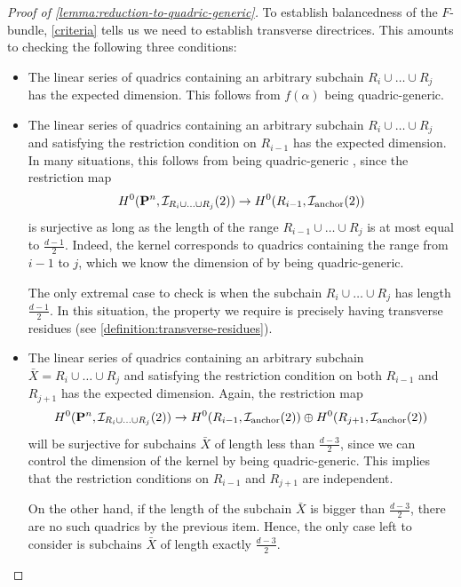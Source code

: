 \documentclass[11pt, two side, letterpaper, final]{amsart}
\renewcommand{\P}{{\bf P}}
\begin{document}
\begin{proof}[Proof of \cref{lemma:reduction-to-quadric-generic}]
To establish balancedness of the $F$-bundle, \cref{criteria} tells us we need to establish transverse directrices.
This amounts to checking the following three conditions:
\begin{itemize}
	\item The linear series of quadrics containing  an arbitrary subchain $R_i \cup \ldots \cup R_j$ has the expected dimension.
	This follows from $f(\alpha)$ being quadric-generic.
	\item The linear series of quadrics containing  an arbitrary subchain $R_i \cup \ldots \cup R_j$
	and satisfying the restriction condition on $R_{i-1}$ has the expected dimension.
	In many situations, this follows from being quadric-generic , since the restriction map
	\[
		H^0(\P^n, \sh{I}_{R_i \cup \ldots \cup R_j}(2)) \to 
		H^0(R_{i-1},\sh{I}_{\text{anchor}}(2))
	\]
	is surjective as long as the length of the range $R_{i-1} \cup \ldots \cup R_j$ is at most equal to $\frac{d-1}{2}$. Indeed, the kernel corresponds to quadrics
	containing the range from $i-1$ to $j$, which we know the dimension of by being quadric-generic.

	The only extremal case to check is when the subchain $R_i \cup \ldots \cup R_j$ has length
	$\frac{d-1}{2}$. In this situation, the property we require is precisely having transverse residues (see \cref{definition:transverse-residues}).

	\item The linear series of quadrics containing 
	an arbitrary subchain $\bar{X}=R_i \cup \ldots \cup R_j$ and satisfying the restriction condition
	on both $R_{i-1}$ and $R_{j+1}$ has the expected dimension. Again, the restriction map
	\[
		H^0(\P^n, \sh{I}_{R_i \cup \ldots \cup R_j}(2)) \to 
		H^0(R_{i-1},\sh{I}_{\text{anchor}}(2)) \oplus H^0(R_{j+1},\sh{I}_{\text{anchor}}(2))
	\]
	will be surjective for subchains $\bar{X}$ of length less than $\frac{d-3}{2}$, since we can control
	the dimension of the kernel by being quadric-generic. This implies that the restriction conditions on
	$R_{i-1}$ and $R_{j+1}$ are independent.

	On the other hand, if the length of the
	subchain $\bar{X}$ is bigger than $\frac{d-3}{2}$, there are no such quadrics by the previous item. Hence,
	the only case left to consider is subchains $\bar{X}$ of length exactly $\frac{d-3}{2}$.


\end{itemize}
\end{proof}
\end{document}
